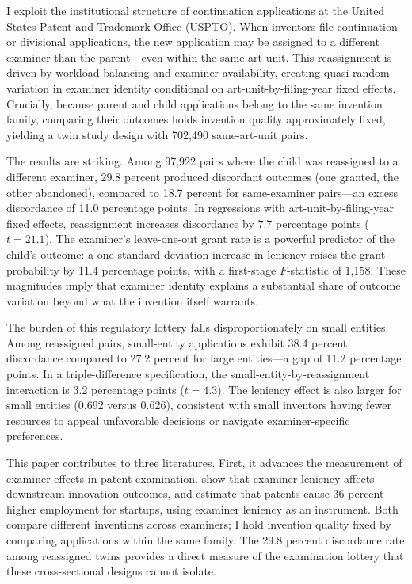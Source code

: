 \documentclass[12pt]{article}
\begin{document}
I exploit the institutional structure of continuation applications at the United States Patent and Trademark Office (USPTO). When inventors file continuation or divisional applications, the new application may be assigned to a different examiner than the parent---even within the same art unit. This reassignment is driven by workload balancing and examiner availability, creating quasi-random variation in examiner identity conditional on art-unit-by-filing-year fixed effects. Crucially, because parent and child applications belong to the same invention family, comparing their outcomes holds invention quality approximately fixed, yielding a twin study design with 702,490 same-art-unit pairs.

The results are striking. Among 97,922 pairs where the child was reassigned to a different examiner, 29.8 percent produced discordant outcomes (one granted, the other abandoned), compared to 18.7 percent for same-examiner pairs---an excess discordance of 11.0 percentage points. In regressions with art-unit-by-filing-year fixed effects, reassignment increases discordance by 7.7 percentage points ($t = 21.1$). The examiner's leave-one-out grant rate is a powerful predictor of the child's outcome: a one-standard-deviation increase in leniency raises the grant probability by 11.4 percentage points, with a first-stage $F$-statistic of 1,158. These magnitudes imply that examiner identity explains a substantial share of outcome variation beyond what the invention itself warrants.

The burden of this regulatory lottery falls disproportionately on small entities. Among reassigned pairs, small-entity applications exhibit 38.4 percent discordance compared to 27.2 percent for large entities---a gap of 11.2 percentage points. In a triple-difference specification, the small-entity-by-reassignment interaction is 3.2 percentage points ($t = 4.3$). The leniency effect is also larger for small entities (0.692 versus 0.626), consistent with small inventors having fewer resources to appeal unfavorable decisions or navigate examiner-specific preferences.

This paper contributes to three literatures. First, it advances the measurement of examiner effects in patent examination. \citet{sampat2019examiner} show that examiner leniency affects downstream innovation outcomes, and \citet{farre2020patent} estimate that patents cause 36 percent higher employment for startups, using examiner leniency as an instrument. Both compare different inventions across examiners; I hold invention quality fixed by comparing applications within the same family. The 29.8 percent discordance rate among reassigned twins provides a direct measure of the examination lottery that these cross-sectional designs cannot isolate.
\end{document}
